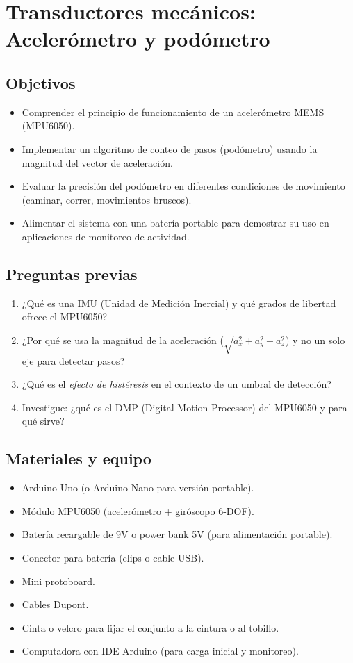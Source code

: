 \chapter{Transductores mecánicos: Acelerómetro y podómetro}

\section*{Objetivos}
\begin{itemize}
    \item Comprender el principio de funcionamiento de un acelerómetro MEMS (MPU6050).
    \item Implementar un algoritmo de conteo de pasos (podómetro) usando la magnitud del vector de aceleración.
    \item Evaluar la precisión del podómetro en diferentes condiciones de movimiento (caminar, correr, movimientos bruscos).
    \item Alimentar el sistema con una batería portable para demostrar su uso en aplicaciones de monitoreo de actividad.
\end{itemize}

\section*{Preguntas previas}
\begin{enumerate}
    \item ¿Qué es una IMU (Unidad de Medición Inercial) y qué grados de libertad ofrece el MPU6050?
    \item ¿Por qué se usa la magnitud de la aceleración (\( \sqrt{a_x^2 + a_y^2 + a_z^2} \)) y no un solo eje para detectar pasos?
    \item ¿Qué es el \textit{efecto de histéresis} en el contexto de un umbral de detección?
    \item Investigue: ¿qué es el DMP (Digital Motion Processor) del MPU6050 y para qué sirve?
\end{enumerate}

\section*{Materiales y equipo}
\begin{itemize}
    \item Arduino Uno (o Arduino Nano para versión portable).
    \item Módulo MPU6050 (acelerómetro + giróscopo 6-DOF).
    \item Batería recargable de 9V o power bank 5V (para alimentación portable).
    \item Conector para batería (clips o cable USB).
    \item Mini protoboard.
    \item Cables Dupont.
    \item Cinta o velcro para fijar el conjunto a la cintura o al tobillo.
    \item Computadora con IDE Arduino (para carga inicial y monitoreo).
\end{itemize}

